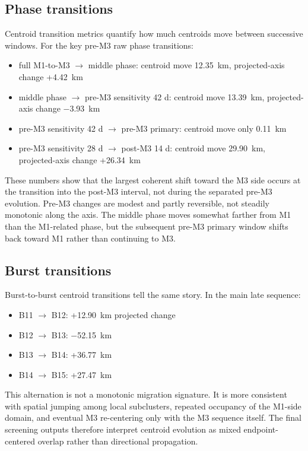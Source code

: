 \documentclass[11pt]{article}
\begin{document}
\subsection{Phase transitions}
Centroid transition metrics quantify how much centroids move between successive windows. For the key pre-M3 raw phase transitions:
\begin{itemize}[leftmargin=1.5em]
    \item full M1-to-M3 $\rightarrow$ middle phase: centroid move \SI{12.35}{km}, projected-axis change +\SI{4.42}{km}
    \item middle phase $\rightarrow$ pre-M3 sensitivity 42 d: centroid move \SI{13.39}{km}, projected-axis change $-$\SI{3.93}{km}
    \item pre-M3 sensitivity 42 d $\rightarrow$ pre-M3 primary: centroid move only \SI{0.11}{km}
    \item pre-M3 sensitivity 28 d $\rightarrow$ post-M3 14 d: centroid move \SI{29.90}{km}, projected-axis change +\SI{26.34}{km}
\end{itemize}

These numbers show that the largest coherent shift toward the M3 side occurs at the transition into the post-M3 interval, not during the separated pre-M3 evolution. Pre-M3 changes are modest and partly reversible, not steadily monotonic along the axis. The middle phase moves somewhat farther from M1 than the M1-related phase, but the subsequent pre-M3 primary window shifts back toward M1 rather than continuing to M3.

\subsection{Burst transitions}
Burst-to-burst centroid transitions tell the same story. In the main late sequence:
\begin{itemize}[leftmargin=1.5em]
    \item B11 $\rightarrow$ B12: +\SI{12.90}{km} projected change
    \item B12 $\rightarrow$ B13: $-$\SI{52.15}{km}
    \item B13 $\rightarrow$ B14: +\SI{36.77}{km}
    \item B14 $\rightarrow$ B15: +\SI{27.47}{km}
\end{itemize}

This alternation is not a monotonic migration signature. It is more consistent with spatial jumping among local subclusters, repeated occupancy of the M1-side domain, and eventual M3 re-centering only with the M3 sequence itself. The final screening outputs therefore interpret centroid evolution as mixed endpoint-centered overlap rather than directional propagation.
\end{document}
